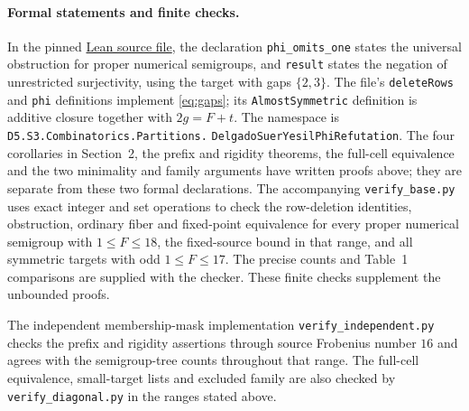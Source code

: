 \documentclass[11pt,a4paper]{article}
\theoremstyle{definition}
\theoremstyle{remark}
\begin{document}
\paragraph{Formal statements and finite checks.}
In the pinned \href{https://github.com/the-omega-institute/trureturing/blob/f960cb09514c99f42fd07398f5240a77378ea4db/D5/S3/Combinatorics/Partitions/DelgadoSuerYesilPhiRefutation.lean}{Lean source file},
the declaration \texttt{phi\_omits\_one} states the universal obstruction for
proper numerical semigroups, and \texttt{result} states the negation of
unrestricted surjectivity, using the target with gaps $\{2,3\}$.
The file's \texttt{deleteRows} and \texttt{phi} definitions implement
\eqref{eq:gaps}; its \texttt{AlmostSymmetric} definition is additive closure
together with $2g=F+t$. The namespace is
\texttt{D5.S3.Combinatorics.Partitions.}\allowbreak
\texttt{DelgadoSuerYesilPhiRefutation}.
The four corollaries in Section~2, the prefix and rigidity theorems,
the full-cell equivalence and the two minimality and family arguments
have written proofs above; they are separate from these two formal declarations.
The accompanying \texttt{verify\_base.py} uses exact integer and set operations to
check the row-deletion identities, obstruction, ordinary fiber and fixed-point
equivalence for every proper numerical semigroup with $1\leq F\leq18$,
the fixed-source bound in that range, and all symmetric targets with odd
$1\leq F\leq17$. The precise counts and Table~1 comparisons are supplied
with the checker. These finite checks supplement the unbounded proofs.


The independent membership-mask implementation
\texttt{verify\_independent.py} checks the prefix and rigidity assertions
through source Frobenius number $16$ and agrees with the semigroup-tree
counts throughout that range. The full-cell equivalence, small-target lists
and excluded family are also checked by \texttt{verify\_diagonal.py} in
the ranges stated above.
\end{document}
